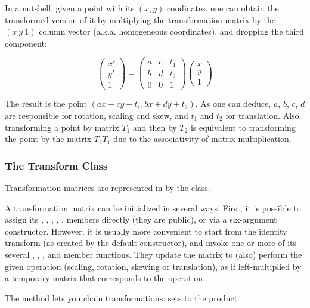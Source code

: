 In a nutshell, given a point with its $(x, y)$ coodinates, one can obtain the
transformed version of it by multiplying the transformation matrix by the
$(x \ y \ 1)$ column vector (a.k.a. homogeneous coordinates), and dropping the
third component:

\[ \left( \begin{array}{c} x' \\ y' \\ 1 \end{array} \right)
 = \left( \begin{array}{ccc}
a & c & t_1 \\
b & d & t_2 \\
0 & 0 & 1 \end{array} \right)
\left( \begin{array}{c} x \\ y \\ 1 \end{array} \right)
\]

The result is the point $(ax+cy+t_1, bx+dy+t_2)$. As one can deduce, $a$,
$b$, $c$, $d$ are responsible for rotation, scaling and skew, and $t_1$ and
$t_2$ for translation. Also, transforming a point by matrix $T_1$ and then by
$T_2$ is equivalent to transforming the point by the matrix $T_2 T_1$ due to
the associativity of matrix multiplication.


\subsubsection{The Transform Class}

Transformation matrices are represented in {\opp} by the 
class.

A  transformation matrix can be initialized in
several ways. First, it is possible to assign its , ,
, , ,  members directly (they are public), or
via a six-argument constructor. However, it is usually more convenient to
start from the identity transform (as created by the default constructor), and
invoke one or more of its several , ,
,  and  member functions.
They update the matrix to (also) perform the given operation (scaling,
rotation, skewing or translation), as if left-multiplied by a temporary
matrix that corresponds to the operation.

The  method lets you chain transformations: 
sets  to the product .

